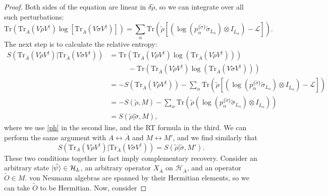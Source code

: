 \documentclass[12pt,a4paper]{report}
\numberwithin{equation}{section}
\newcommand{\ol}[1]{\overline{#1}}
\newcommand{\tr}{\text{Tr}}
\theoremstyle{definition}
\theoremstyle{theorem}
\theoremstyle{theorem}
\theoremstyle{example}
\theoremstyle{definition}
\begin{document}
\begin{proof}
	Both sides of the equation are linear in $\delta\tilde{\rho}$, so we can integrate over all such perturbations:
	\begin{equation}\label{ph}
		\tr\left(\tr_{\ol{A}}\left(V\tilde{\rho} V^{\dagger}\right)\log\left[\tr_{\ol{A}}\left(V\tilde{\sigma} V^{\dagger}\right)\right]\right)=\sum_{\alpha}\tr\left(\tilde{\rho}\left[\left(\log\left(p_{\alpha}^{\{\tilde{\sigma}\}}\tilde{\sigma}_{L_{\alpha}}\right)\otimes I_{\ol{L}_{\alpha}}\right)-\mathcal{L}\right]\right).
	\end{equation}
	The next step is to calculate the relative entropy:
	\begin{equation}
		\begin{aligned}
			S\left(\tr_{\ol{A}}\left(V\tilde{\rho} V^{\dagger}\right)|\tr_{\ol{A}}\left(V\tilde{\sigma} V^{\dagger}\right)\right)&=\tr\left(\tr_{\ol{A}}\left(V\tilde{\rho} V^{\dagger}\right)\log\left(\tr_{\ol{A}}\left(V\tilde{\rho} V^{\dagger}\right)\right)\right)\\&\phantom{==}-\tr\left(\tr_{\ol{A}}\left(V\tilde{\rho} V^{\dagger}\right)\log\left(\tr_{\ol{A}}\left(V\tilde{\sigma} V^{\dagger}\right)\right)\right)\\&=-S\left(\tr_{\ol{A}}\left(V\tilde{\rho} V^{\dagger}\right)\right)-\sum_{\alpha}\tr\left(\tilde{\rho}\left[\left(\log\left(p_{\alpha}^{\{\tilde{\sigma}\}}\tilde{\sigma}_{L_{\alpha}}\right)\otimes I_{\ol{L}_{\alpha}}\right)-\mathcal{L}\right]\right)\\&=-S(\tilde{\rho},M)-\sum_{\alpha}\tr\left(\tilde{\rho}\left(\log\left(p_{\alpha}^{\{\tilde{\sigma}\}}\tilde{\sigma}_{L_{\alpha}}\right)\otimes I_{\ol{L}_{\alpha}}\right)\right)\\&=S(\tilde{\rho}|\tilde{\sigma},M),
		\end{aligned}
	\end{equation}
	where we use \ref{ph} in the second line, and the RT formula in the third. We can perform the same argument with ${A}\leftrightarrow \ol{A}$ and $M\leftrightarrow M'$, and we find similarly that
	\begin{equation}\label{asd}
		S(\tr_{{A}}(V\tilde{\rho} V^{\dagger})|\tr_{\ol{A}}(V\tilde{\sigma} V^{\dagger}))=S(\tilde{\rho}|\tilde{\sigma},M').
	\end{equation}
	These two conditions together in fact imply complementary recovery. Consider an arbitrary state $\ket{\tilde{\psi}}\in\mathcal{H}_{L}$, an arbitrary operator $X_{\ol{A}}$ on $\mathcal{H}_{\ol{A}}$, and an operator $\tilde{O}\in M$. von Neumann algebras are spanned by their Hermitian elements, so we can take $\tilde{O}$ to be Hermitian. Now, consider

\end{proof}
\end{document}
